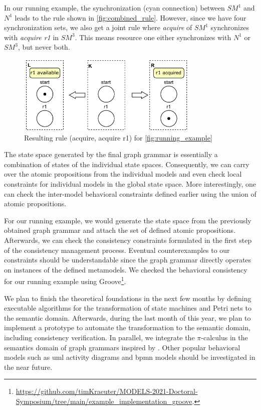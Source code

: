 \documentclass[conference]{IEEEtran}
\begin{document}
In our running example, the synchronization (cyan connection) between $SM^1$ and $N^1$ leads to the rule shown in \autoref{fig:combined_rule}.
However, since we have four synchronization sets, we also get a joint rule where \textit{acquire} of $SM^1$ synchronizes with \textit{acquire r1} in $SM^3$.
This means resource one either synchronizes with $N^1$ or $SM^3$, but never both.

\begin{figure}[h]
    \centering
    \includegraphics[width=3.4in]{combined_rule}
    \caption{Resulting rule (acquire, acquire r1) for \autoref{fig:running_example}}
    \label{fig:combined_rule}
\end{figure}

The state space generated by the final graph grammar is essentially a combination of states of the individual state spaces.
Consequently, we can carry over the atomic propositions from the individual models and even check local constraints for individual models in the global state space.
More interestingly, one can check the inter-model behavioral constraints defined earlier using the union of atomic propositions.

For our running example, we would generate the state space from the previously obtained graph grammar and attach the set of defined atomic propositions.
Afterwards, we can check the consistency constraints formulated in the first step of the consistency management process.
Eventual counterexamples to our constraints should be understandable since the graph grammar directly operates on instances of the defined metamodels.
We checked the behavioral consistency for our running example using Groove\footnote{\url{https://github.com/timKraeuter/MODELS-2021-Doctoral-Symposium/tree/main/example_implementation_groove}.}.

We plan to finish the theoretical foundations in the next few months by defining executable algorithms for the transformation of state machines and Petri nets to the semantic domain.
Afterwards, during the last month of this year, we plan to implement a prototype to automate the transformation to the semantic domain, including consistency verification.
In parallel, we integrate the $\pi$-calculus in the semantics domain of graph grammars inspired by \cite{gadducciGraphRewritingPcalculus2007}.
Other popular behavioral models such as \gls{uml} activity diagrams and \gls{bpmn} models should be investigated in the near future. 
\end{document}
